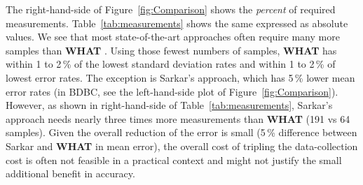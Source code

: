 \documentclass{newsig}
\newcommand{\bi}{\begin{itemize}}%
\newcommand{\ei}{\end{itemize}}
\newcommand{\fig}[1]{Figure~\ref{fig:#1}}
\newcommand{\what}{{\bf WHAT }}
\begin{document}
The right-hand-side of Figure~\ref{fig:Comparison}   shows
the {\em percent} of required measurements. Table~\ref{tab:measurements} shows the same
expressed as absolute values. We see that most state-of-the-art approaches often require many more samples than
\what{}.  Using those fewest numbers of samples, \what has
within 1 to 2\,\% of the lowest standard deviation rates 
and within 1 to 2\,\% of lowest error rates.
The exception is Sarkar's approach, which has 5\,\% lower mean error
rates (in BDBC, see the left-hand-side plot of Figure~\ref{fig:Comparison}).  However, 
as shown in right-hand-side of Table~\ref{tab:measurements}, Sarkar's approach needs nearly three times
more measurements than \what (191 vs 64 samples). Given
the overall reduction of the error is   small (5\,\% difference
between Sarkar and \what in mean error), the overall
cost of tripling the data-collection cost is
often not feasible in a practical context and might not justify the small additional benefit in accuracy. 


    






% 

% 

% 

% 



\end{document}
